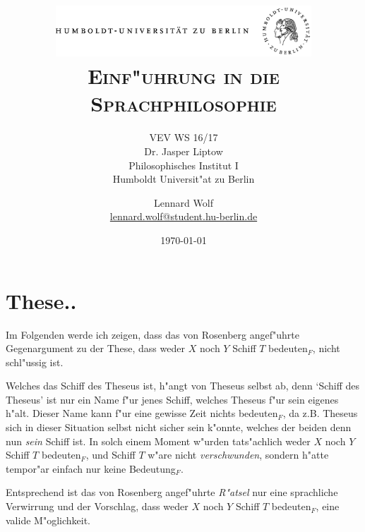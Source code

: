 \documentclass[a4paper, emulatestandardclasses, 12pt]{scrartcl}
\date{\vspace{-3ex}}
\begin{document}
\title{
	\includegraphics*[width=0.72\textwidth]{images/hu_logo.png}\\
	\vspace{20pt}
	\scshape\LARGE{Einf"uhrung in die\\Sprachphilosophie}}
	
	\subtitle{\vspace{20pt}VEV WS 16/17\\
          Dr. Jasper Liptow\\
          Philosophisches Institut I \\ 
          Humboldt Universit"at zu Berlin}

\vspace{20pt}
\author{Lennard Wolf\\
        \small{\href{mailto:lennard.wolf@student.hu-berlin.de}{lennard.wolf@student.hu-berlin.de}}}
\vfill        
\date{\today}
\maketitle
\newpage


\section*{These..}
\begin{onehalfspace} 

Im Folgenden werde ich zeigen, dass das von Rosenberg angef"uhrte Gegenargument zu der These, dass weder $X$ noch $Y$ Schiff $T$ bedeuten$_{F}$, nicht schl"ussig ist. 

Welches das Schiff des Theseus ist, h"angt von Theseus selbst ab, denn `Schiff des Theseus' ist nur ein Name f"ur jenes Schiff, welches Theseus f"ur sein eigenes h"alt. Dieser Name kann f"ur eine gewisse Zeit nichts bedeuten$_{F}$, da z.B. Theseus sich in dieser Situation selbst nicht sicher sein k"onnte, welches der beiden denn nun \emph{sein} Schiff ist. In solch einem Moment w"urden tats"achlich weder $X$ noch $Y$ Schiff $T$ bedeuten$_{F}$, und Schiff $T$ w"are nicht \emph{verschwunden}, sondern h"atte tempor"ar einfach nur keine Bedeutung$_{F}$.

Entsprechend ist das von Rosenberg angef"uhrte \emph{R"atsel} nur eine sprachliche Verwirrung und der Vorschlag, dass weder $X$ noch $Y$ Schiff $T$ bedeuten$_{F}$, eine valide M"oglichkeit.

\end{onehalfspace}
\end{document}
